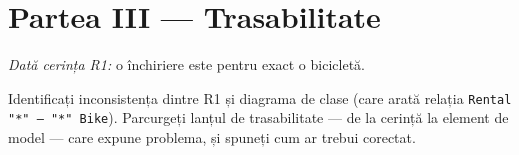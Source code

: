\documentclass[12pt,a4paper]{article}
\begin{document}
\vspace{5.5cm}

\section*{Partea III — Trasabilitate}

\textit{Dată cerința R1:} o închiriere este pentru exact o bicicletă.

Identificați inconsistența dintre R1 și diagrama de clase (care arată
relația \texttt{Rental "*" -- "*" Bike}). Parcurgeți lanțul de
trasabilitate — de la cerință la element de model — care expune
problema, și spuneți cum ar trebui corectat.

\vspace{5.5cm}
\end{document}
